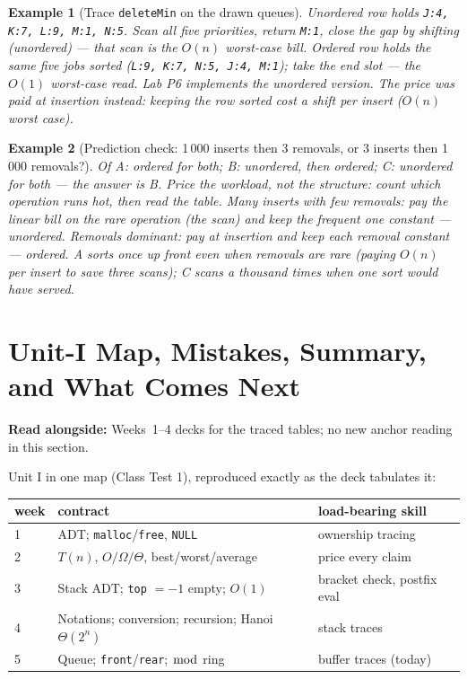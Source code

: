 \documentclass[11pt]{article}
\newtheorem{example}{Example}[section]
\begin{document}
\begin{example}[Trace \texttt{deleteMin} on the drawn queues]
Unordered row holds \texttt{J:4, K:7, L:9, M:1, N:5}. Scan all five priorities, return \texttt{M:1}, close the gap by shifting (unordered) --- that scan is the $O(n)$ worst-case bill. Ordered row holds the same five jobs sorted (\texttt{L:9, K:7, N:5, J:4, M:1}); take the end slot --- the $O(1)$ worst-case read. Lab P6 implements the unordered version. The price was paid at insertion instead: keeping the row sorted cost a shift per insert ($O(n)$ worst case).
\end{example}

\begin{example}[Prediction check: 1\,000 inserts then 3 removals, or 3 inserts then 1\,000 removals?]
Of A: ordered for both; B: unordered, then ordered; C: unordered for both --- the answer is B. Price the workload, not the structure: count which operation runs hot, then read the table. Many inserts with few removals: pay the linear bill on the rare operation (the scan) and keep the frequent one constant --- unordered. Removals dominant: pay at insertion and keep each removal constant --- ordered. A sorts once up front even when removals are rare (paying $O(n)$ per insert to save three scans); C scans a thousand times when one sort would have served.
\end{example}

\section{Unit-I Map, Mistakes, Summary, and What Comes Next}

\textbf{Read alongside:} Weeks~1--4 decks for the traced tables; no new anchor reading in this section.

Unit I in one map (Class Test 1), reproduced exactly as the deck tabulates it:

\begin{center}
{\footnotesize
\begin{tabular}{lll}
  \toprule
  \textbf{week} & \textbf{contract} & \textbf{load-bearing skill} \\
  \midrule
  1 & ADT; \texttt{malloc}/\texttt{free}, \texttt{NULL} & ownership tracing \\
  2 & $T(n)$, $O/\Omega/\Theta$, best/worst/average & price every claim \\
  3 & Stack ADT; \texttt{top} $= -1$ empty; $O(1)$ & bracket check, postfix eval \\
  4 & Notations; conversion; recursion; Hanoi $\Theta(2^{n})$ & stack traces \\
  5 & Queue; \texttt{front}/\texttt{rear}; $\bmod$ ring & buffer traces (today) \\
  \bottomrule
\end{tabular}}
\end{center}
\end{document}
